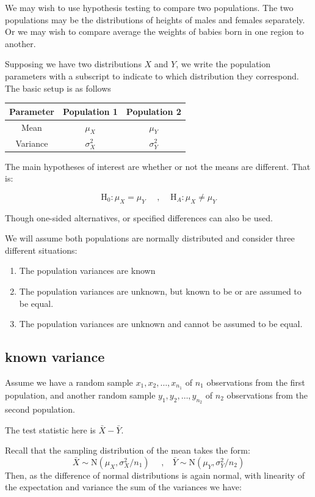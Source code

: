 \documentclass[
]{book}
\theoremstyle{definition}
\theoremstyle{definition}
\theoremstyle{definition}
\theoremstyle{definition}
\theoremstyle{remark}
\begin{document}
We may wish to use hypothesis testing to compare two populations. The two populations may be the distributions of heights of males and females separately. Or we may wish to compare average the weights of babies born in one region to another.

Supposing we have two distributions \(X\) and \(Y\), we write the population parameters with a subscript to indicate to which distribution they correspond. The basic setup is as follows

\begin{longtable}[]{@{}ccc@{}}
\toprule
Parameter & Population 1 & Population 2\tabularnewline
\midrule
\endhead
Mean & \(\mu_X\) & \(\mu_Y\)\tabularnewline
Variance & \(\sigma^2_X\) & \(\sigma^2_Y\)\tabularnewline
\bottomrule
\end{longtable}

The main hypotheses of interest are whether or not the means are different. That is:

\[\text{H}_0: \mu_X = \mu_Y \ \ \ \ \ \ , \ \ \ \ \ \text{H}_A:\mu_X \neq \mu_Y\]

Though one-sided alternatives, or specified differences can also be used.

We will assume both populations are normally distributed and consider three different situations:

\begin{enumerate}
\def\labelenumi{\alph{enumi})}
\item
  The population variances are known
\item
  The population variances are unknown, but known to be or are assumed to be equal.
\item
  The population variances are unknown and cannot be assumed to be equal.
\end{enumerate}

\hypertarget{known-variance}{%
\subsection{known variance}\label{known-variance}}

Assume we have a random sample \(x_1,x_2,\ldots,x_{n_1}\) of \(n_1\) observations from the first population, and another random sample \(y_1,y_2,\ldots, y_{n_2}\) of \(n_2\) observations from the second population.

The test statistic here is \(\bar{X}-\bar{Y}\).

Recall that the sampling distribution of the mean takes the form:
\[\bar{X} \sim \text{N}(\mu_X, \sigma^2_X / n_1) \ \ \ \ \ \ , \ \ \ \ \bar{Y} \sim \text{N}(\mu_Y, \sigma^2_Y / n_2)\]
Then, as the difference of normal distributions is again normal, with linearity of the expectation and variance the sum of the variances we have:
\end{document}
